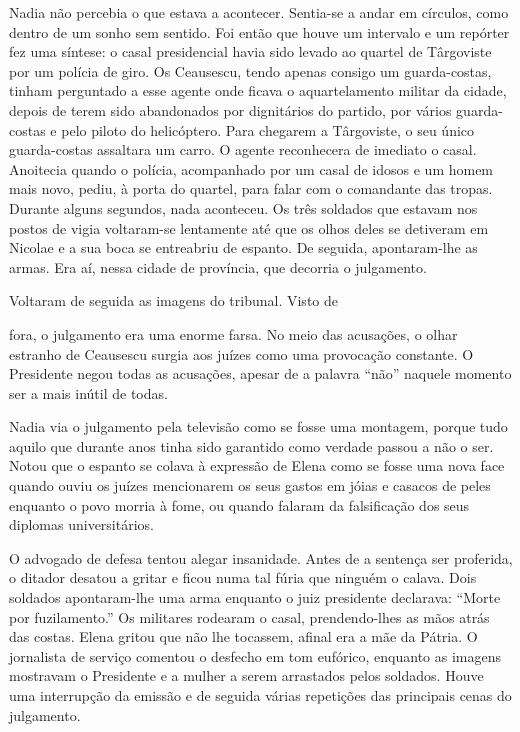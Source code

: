 Nadia não percebia o que estava a acontecer. Sentia-se
a andar em círculos, como dentro de um sonho sem sentido. Foi então que houve um intervalo e um repórter fez uma síntese: o
casal presidencial havia sido levado ao quartel de Târgoviste por um
polícia de giro. Os Ceausescu, tendo apenas consigo um guarda-costas,
tinham perguntado a esse agente onde ficava o aquartelamento militar da
cidade, depois de terem sido abandonados por dignitários do partido, por
vários guarda-costas e pelo piloto do helicóptero. Para chegarem a
Târgoviste, o seu único guarda-costas assaltara um carro. O agente
reconhecera de imediato o casal. Anoitecia quando o polícia,
acompanhado por um casal de idosos e um homem mais novo, pediu, à porta
do quartel, para falar com o comandante das tropas. Durante alguns
segundos, nada aconteceu. Os três soldados que estavam nos postos de
vigia voltaram-se lentamente até que os olhos deles se detiveram em
Nicolae e a sua boca se entreabriu de espanto. De seguida, apontaram-lhe
as armas. Era aí, nessa cidade de província, que decorria o julgamento.

Voltaram de seguida as imagens do tribunal. Visto de

fora, o julgamento era uma enorme farsa. No meio das acusações, o olhar
estranho de Ceausescu surgia aos juízes como uma provocação constante. O
Presidente negou todas as acusações, apesar de a palavra ``não'' naquele
momento ser a mais inútil de todas.

Nadia via o julgamento pela televisão como se fosse uma montagem, porque
tudo aquilo que durante anos tinha sido garantido como verdade passou a
não o ser. Notou que o espanto se colava à expressão de Elena como se
fosse uma nova face quando ouviu os juízes mencionarem os seus gastos
em jóias e casacos de peles enquanto o
povo morria à fome, ou quando falaram da falsificação dos seus diplomas
universitários.

O advogado de defesa tentou alegar insanidade. Antes de a sentença ser
proferida, o ditador desatou a gritar e ficou numa tal fúria que ninguém
o calava. Dois soldados apontaram-lhe uma arma enquanto o juiz
presidente declarava: ``Morte por fuzilamento.'' Os militares rodearam o
casal, prendendo-lhes as mãos atrás das costas. Elena gritou que não lhe
tocassem, afinal era a mãe da Pátria. O jornalista de serviço comentou o
desfecho em tom eufórico, enquanto as imagens mostravam o Presidente e
a mulher a serem arrastados pelos soldados. Houve uma interrupção da
emissão e de seguida várias repetições das principais cenas do
julgamento.

